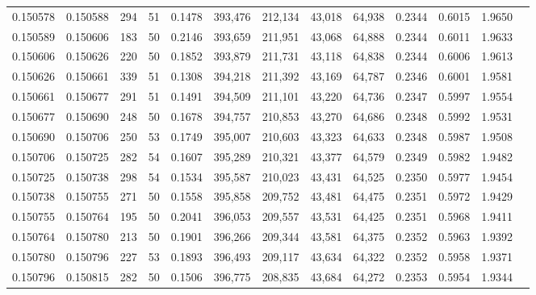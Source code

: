 \begin{tabular}{rrrrrrrrrrrrr}
0.150578 & 0.150588 &   294 &  51 &                                     0.1478 & 393,476 & 212,134 &  43,018 &  64,938 & 0.2344 & 0.6015 & 1.9650 \\
0.150589 & 0.150606 &   183 &  50 &                                     0.2146 & 393,659 & 211,951 &  43,068 &  64,888 & 0.2344 & 0.6011 & 1.9633 \\
0.150606 & 0.150626 &   220 &  50 &                                     0.1852 & 393,879 & 211,731 &  43,118 &  64,838 & 0.2344 & 0.6006 & 1.9613 \\
0.150626 & 0.150661 &   339 &  51 &                                     0.1308 & 394,218 & 211,392 &  43,169 &  64,787 & 0.2346 & 0.6001 & 1.9581 \\
0.150661 & 0.150677 &   291 &  51 &                                     0.1491 & 394,509 & 211,101 &  43,220 &  64,736 & 0.2347 & 0.5997 & 1.9554 \\
0.150677 & 0.150690 &   248 &  50 &                                     0.1678 & 394,757 & 210,853 &  43,270 &  64,686 & 0.2348 & 0.5992 & 1.9531 \\
0.150690 & 0.150706 &   250 &  53 &                                     0.1749 & 395,007 & 210,603 &  43,323 &  64,633 & 0.2348 & 0.5987 & 1.9508 \\
0.150706 & 0.150725 &   282 &  54 &                                     0.1607 & 395,289 & 210,321 &  43,377 &  64,579 & 0.2349 & 0.5982 & 1.9482 \\
0.150725 & 0.150738 &   298 &  54 &                                     0.1534 & 395,587 & 210,023 &  43,431 &  64,525 & 0.2350 & 0.5977 & 1.9454 \\
0.150738 & 0.150755 &   271 &  50 &                                     0.1558 & 395,858 & 209,752 &  43,481 &  64,475 & 0.2351 & 0.5972 & 1.9429 \\
0.150755 & 0.150764 &   195 &  50 &                                     0.2041 & 396,053 & 209,557 &  43,531 &  64,425 & 0.2351 & 0.5968 & 1.9411 \\
0.150764 & 0.150780 &   213 &  50 &                                     0.1901 & 396,266 & 209,344 &  43,581 &  64,375 & 0.2352 & 0.5963 & 1.9392 \\
0.150780 & 0.150796 &   227 &  53 &                                     0.1893 & 396,493 & 209,117 &  43,634 &  64,322 & 0.2352 & 0.5958 & 1.9371 \\
0.150796 & 0.150815 &   282 &  50 &                                     0.1506 & 396,775 & 208,835 &  43,684 &  64,272 & 0.2353 & 0.5954 & 1.9344 \\

\end{tabular}
